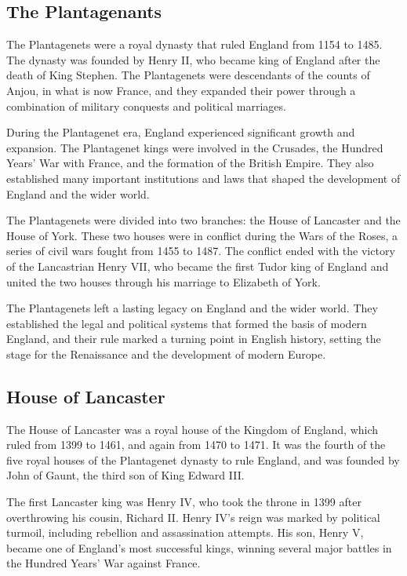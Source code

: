 \documentclass[11pt,article,oneside]{memoir}
\begin{document}
\hypertarget{the-plantagenants}{%
\subsection{The Plantagenants}\label{the-plantagenants}}

The Plantagenets were a royal dynasty that ruled England from 1154 to
1485. The dynasty was founded by Henry II, who became king of England
after the death of King Stephen. The Plantagenets were descendants of
the counts of Anjou, in what is now France, and they expanded their
power through a combination of military conquests and political
marriages.

During the Plantagenet era, England experienced significant growth and
expansion. The Plantagenet kings were involved in the Crusades, the
Hundred Years' War with France, and the formation of the British Empire.
They also established many important institutions and laws that shaped
the development of England and the wider world.

The Plantagenets were divided into two branches: the House of Lancaster
and the House of York. These two houses were in conflict during the Wars
of the Roses, a series of civil wars fought from 1455 to 1487. The
conflict ended with the victory of the Lancastrian Henry VII, who became
the first Tudor king of England and united the two houses through his
marriage to Elizabeth of York.

The Plantagenets left a lasting legacy on England and the wider world.
They established the legal and political systems that formed the basis
of modern England, and their rule marked a turning point in English
history, setting the stage for the Renaissance and the development of
modern Europe.

\hypertarget{house-of-lancaster}{%
\subsection{House of Lancaster}\label{house-of-lancaster}}

The House of Lancaster was a royal house of the Kingdom of England,
which ruled from 1399 to 1461, and again from 1470 to 1471. It was the
fourth of the five royal houses of the Plantagenet dynasty to rule
England, and was founded by John of Gaunt, the third son of King Edward
III.

The first Lancaster king was Henry IV, who took the throne in 1399 after
overthrowing his cousin, Richard II. Henry IV's reign was marked by
political turmoil, including rebellion and assassination attempts. His
son, Henry V, became one of England's most successful kings, winning
several major battles in the Hundred Years' War against France.
\end{document}
